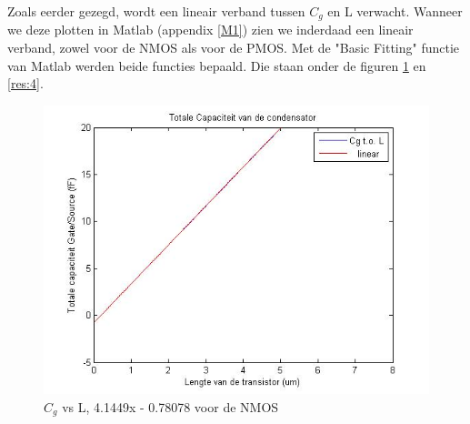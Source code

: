 \documentclass{report}
\begin{document}
Zoals eerder gezegd, wordt een lineair verband tussen $C_g$ en L verwacht. Wanneer we deze plotten in Matlab (appendix  \ref{M1}) zien we inderdaad een lineair verband, zowel voor de NMOS als voor de PMOS. Met de "Basic Fitting" functie van Matlab werden beide functies bepaald. Die staan onder de figuren \ref{res:3} en \ref{res:4}.

\begin{figure} [h!]
\centering
\includegraphics [scale = 0.4] {../figures/c0.jpg}
\caption{$C_g$ vs L, 4.1449x - 0.78078 voor de NMOS}
\label{res:3}
\end{figure}
\end{document}
